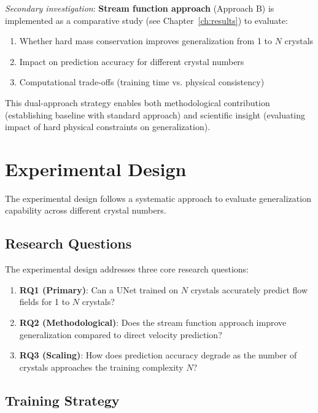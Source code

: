 \textit{Secondary investigation}: \textbf{Stream function approach} (Approach B) is implemented as a comparative study (see Chapter~\ref{ch:results}) to evaluate:
\begin{enumerate}
    \item Whether hard mass conservation improves generalization from 1 to $N$ crystals
    \item Impact on prediction accuracy for different crystal numbers
    \item Computational trade-offs (training time vs. physical consistency)
\end{enumerate}

This dual-approach strategy enables both methodological contribution (establishing baseline with standard approach) and scientific insight (evaluating impact of hard physical constraints on generalization).

\section{Experimental Design}
\label{sec:experimental_design}

The experimental design follows a systematic approach to evaluate generalization capability across different crystal numbers.

\subsection{Research Questions}

The experimental design addresses three core research questions:

\begin{enumerate}
    \item \textbf{RQ1 (Primary)}: Can a UNet trained on $N$ crystals accurately predict flow fields for 1 to $N$ crystals?
    \item \textbf{RQ2 (Methodological)}: Does the stream function approach improve generalization compared to direct velocity prediction?
    \item \textbf{RQ3 (Scaling)}: How does prediction accuracy degrade as the number of crystals approaches the training complexity $N$?
\end{enumerate}

\subsection{Training Strategy}

